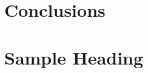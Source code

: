 \documentclass[a4paper,12pt]{report}
\begin{document}
\chapter{Conclusions\label{Con}}

\appendix
\chapter{Sample Heading \label{AP1}}




\end{document}
